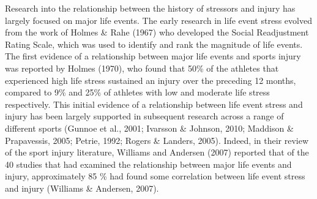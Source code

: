 \documentclass[
  english,
  man,floatsintext]{apa6}
\begin{document}
Research into the relationship between the history of stressors and injury has largely focused on major life events.
The early research in life event stress evolved from the work of Holmes \& Rahe (1967) who developed the Social Readjustment Rating Scale, which was used to identify and rank the magnitude of life events.
The first evidence of a relationship between major life events and sports injury was reported by Holmes (1970),
who found that 50\% of the athletes that experienced high life stress sustained an injury over the preceding 12 months, compared to 9\% and 25\% of athletes with low and moderate life stress respectively.
This initial evidence of a relationship between life event stress and injury has been largely supported in subsequent research across a range of different sports (Gunnoe et al., 2001; Ivarsson \& Johnson, 2010; Maddison \& Prapavessis, 2005; Petrie, 1992; Rogers \& Landers, 2005).
Indeed, in their review of the sport injury literature, Williams and Andersen (2007) reported that of the 40 studies that had examined the relationship between major life events and injury, approximately 85 \% had found some correlation between life event stress and injury (Williams \& Andersen, 2007).
\end{document}
